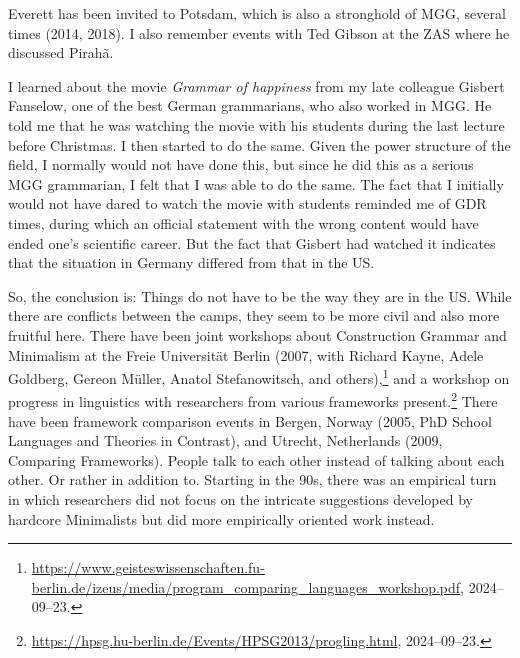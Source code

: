 \documentclass[output=paper,colorlinks,citecolor=brown]{langscibook}
\begin{document}
Everett has been invited to Potsdam, which is also a stronghold of MGG, several times (2014, 2018). I also
remember events with Ted Gibson at the ZAS where he discussed Pirahã.

I learned about the movie \emph{Grammar of happiness} from my late colleague Gisbert Fanselow, one of
the best German grammarians, who also worked in MGG. He told me that he was watching the movie with his
students during the last lecture before Christmas. I then started to do the same. Given the power
structure of the field, I normally would not have done this, but since he did this as a serious MGG grammarian, I
felt that I was able to do the same. The fact that I initially would not have dared to watch the movie with
students reminded me of GDR times, during which an official statement with the wrong content would have
ended one's scientific career. But the fact that Gisbert had watched it indicates that the situation in
Germany differed from that in the US.






So, the conclusion is: Things do not have to be the way they are in the US. While there are conflicts between the camps,
they seem to be more civil and also more fruitful here. There have been joint workshops about
Construction Grammar and Minimalism at the Freie Universität Berlin (2007, with Richard Kayne, Adele
Goldberg, Gereon Müller, Anatol Stefanowitsch, and others),\footnote{
\url{https://www.geisteswissenschaften.fu-berlin.de/izeus/media/program_comparing_languages_workshop.pdf},
2024--09--23.
} and a workshop on progress
in linguistics with researchers from various frameworks present.\footnote{
\url{https://hpsg.hu-berlin.de/Events/HPSG2013/progling.html}, 2024--09--23.
} There have been framework comparison
events in Bergen, Norway (2005, PhD School Languages and Theories in Contrast), and Utrecht,
Netherlands (2009, Comparing Frameworks). People talk to each
other instead of talking about each other. Or rather in addition to. Starting in the 90s, there was an empirical
turn in which researchers did not focus on the intricate suggestions developed by hardcore Minimalists
but did more empirically oriented work instead.
\end{document}
